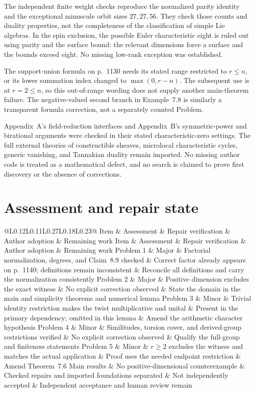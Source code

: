 \documentclass[10pt]{article}
\begin{document}
The independent finite weight checks reproduce the normalized parity identity and the exceptional minuscule orbit sizes \(27,27,56\). They check those counts and duality properties, not the completeness of the classification of simple Lie algebras. In the spin exclusion, the possible Euler characteristic eight is ruled out using parity and the surface bound: the relevant dimensions force a surface and the bounds exceed eight. No missing low-rank exception was established.\par
The support-union formula on p. 1130 needs its stated range restricted to \(r\le n\), or its lower summation index changed to \(\max(0,r-n)\). The subsequent use is at \(r=2\le n\), so this out-of-range wording does not supply another main-theorem failure. The negative-valued second branch in Example 7.8 is similarly a transparent formula correction, not a separately counted Problem.\par
Appendix A’s field-reduction interfaces and Appendix B’s symmetric-power and birational arguments were checked in their stated characteristic-zero settings. The full external theories of constructible sheaves, microlocal characteristic cycles, generic vanishing, and Tannakian duality remain imported. No missing author code is treated as a mathematical defect, and no search is claimed to prove first discovery or the absence of corrections.\par
\section*{Assessment and repair state}
@L0.12L0.11L0.27L0.18L0.23@ Item \& Assessment \& Repair verification \& Author adoption \& Remaining work
Item \& Assessment \& Repair verification \& Author adoption \& Remaining work
Problem 1 \& Major \& Factorial normalization, degrees, and Claim 8.9 checked \& Correct factor already appears on p. 1140; definitions remain inconsistent \& Reconcile all definitions and carry the normalization consistently
Problem 2 \& Major \& Positive dimension excludes the exact witness \& No explicit correction observed \& State the domain in the main and simplicity theorems and numerical lemma
Problem 3 \& Minor \& Trivial identity restriction makes the twist multiplicative and unital \& Present in the primary dependency; omitted in this lemma \& Amend the arithmetic character hypothesis
Problem 4 \& Minor \& Similitudes, torsion cover, and derived-group restrictions verified \& No explicit correction observed \& Qualify the full-group and finiteness statements
Problem 5 \& Minor \& \(r\ge2\) excludes the witness and matches the actual application \& Proof uses the needed endpoint restriction \& Amend Theorem 7.6
Main results \& No positive-dimensional counterexample \& Checked repairs and imported foundations separated \& Not independently accepted \& Independent acceptance and human review remain\par
\end{document}
